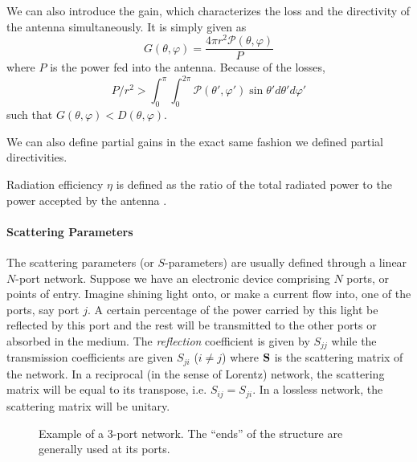 We can also introduce the gain, which characterizes the loss
and the directivity of the antenna simultaneously. It is simply given
as
  \begin{equation}
    G(\theta,\varphi) = \frac{4\pi r^2\mathcal{P}(\theta,\varphi)}{P}
  \end{equation}
where $P$ is the power fed into the antenna. Because of the 
losses, 
	\begin{equation*}
		P/r^2>\int_0^\pi\int_0^{2\pi}\mathcal{P}(\theta',\varphi')\sin\theta'd\theta'd\varphi'
	\end{equation*}
such that $G(\theta,\varphi)<D(\theta,\varphi)$. 

We can also define partial gains in the exact same fashion we defined partial
directivities.

Radiation efficiency $\eta$ is defined as the ratio of the total radiated power 
to the power accepted by the antenna \cite{IEEE145-1993}.

\paragraph{Scattering Parameters}
The scattering parameters (or $S$-parameters) are
usually defined through a linear $N$-port network. 
Suppose we have an electronic device comprising
$N$ ports, or points of entry. Imagine shining light onto, 
or make a current flow into,
one of the ports, say port $j$. A certain percentage
of the power carried by this light be reflected 
by this port and the rest will be transmitted to the
other ports or absorbed in the medium. The \textit{reflection}
coefficient is given by $S_{jj}$ while the transmission
coefficients are given $S_{ji}$ ($i\neq j$) where $\mathbf{S}$
is the scattering matrix of the network. In a reciprocal (in the sense
of Lorentz) network, the scattering matrix will be equal to its
transpose, i.e. $S_{ij}=S_{ji}$. In a lossless network, the scattering
matrix will be unitary. 

\begin{figure}
 \begin{center}
 \end{center}
 \caption[Example of a 3-port network]{Example of a 3-port network. The ``ends'' of the structure are generally used at its ports.}
 \label{fig:active.antennae.network}
\end{figure} 

